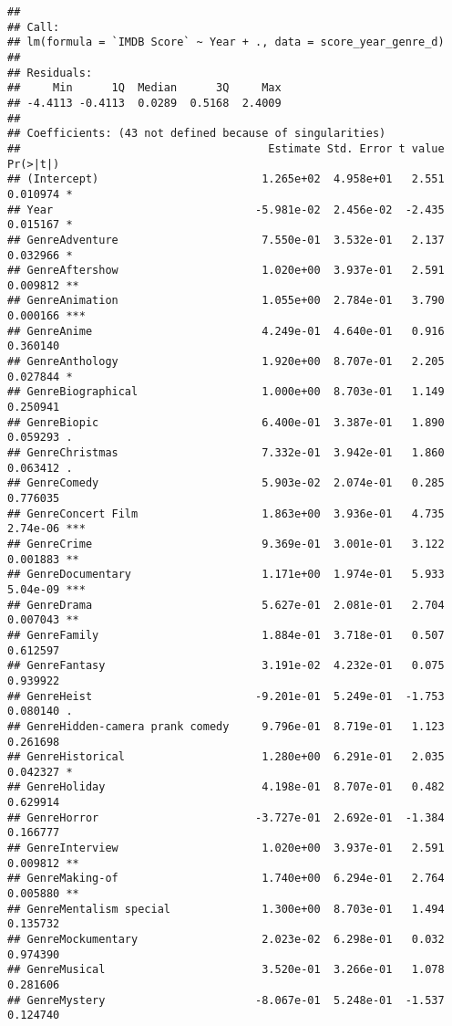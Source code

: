 \documentclass[
]{article}
\begin{document}
\begin{verbatim}
## 
## Call:
## lm(formula = `IMDB Score` ~ Year + ., data = score_year_genre_d)
## 
## Residuals:
##     Min      1Q  Median      3Q     Max 
## -4.4113 -0.4113  0.0289  0.5168  2.4009 
## 
## Coefficients: (43 not defined because of singularities)
##                                      Estimate Std. Error t value Pr(>|t|)    
## (Intercept)                         1.265e+02  4.958e+01   2.551 0.010974 *  
## Year                               -5.981e-02  2.456e-02  -2.435 0.015167 *  
## GenreAdventure                      7.550e-01  3.532e-01   2.137 0.032966 *  
## GenreAftershow                      1.020e+00  3.937e-01   2.591 0.009812 ** 
## GenreAnimation                      1.055e+00  2.784e-01   3.790 0.000166 ***
## GenreAnime                          4.249e-01  4.640e-01   0.916 0.360140    
## GenreAnthology                      1.920e+00  8.707e-01   2.205 0.027844 *  
## GenreBiographical                   1.000e+00  8.703e-01   1.149 0.250941    
## GenreBiopic                         6.400e-01  3.387e-01   1.890 0.059293 .  
## GenreChristmas                      7.332e-01  3.942e-01   1.860 0.063412 .  
## GenreComedy                         5.903e-02  2.074e-01   0.285 0.776035    
## GenreConcert Film                   1.863e+00  3.936e-01   4.735 2.74e-06 ***
## GenreCrime                          9.369e-01  3.001e-01   3.122 0.001883 ** 
## GenreDocumentary                    1.171e+00  1.974e-01   5.933 5.04e-09 ***
## GenreDrama                          5.627e-01  2.081e-01   2.704 0.007043 ** 
## GenreFamily                         1.884e-01  3.718e-01   0.507 0.612597    
## GenreFantasy                        3.191e-02  4.232e-01   0.075 0.939922    
## GenreHeist                         -9.201e-01  5.249e-01  -1.753 0.080140 .  
## GenreHidden-camera prank comedy     9.796e-01  8.719e-01   1.123 0.261698    
## GenreHistorical                     1.280e+00  6.291e-01   2.035 0.042327 *  
## GenreHoliday                        4.198e-01  8.707e-01   0.482 0.629914    
## GenreHorror                        -3.727e-01  2.692e-01  -1.384 0.166777    
## GenreInterview                      1.020e+00  3.937e-01   2.591 0.009812 ** 
## GenreMaking-of                      1.740e+00  6.294e-01   2.764 0.005880 ** 
## GenreMentalism special              1.300e+00  8.703e-01   1.494 0.135732    
## GenreMockumentary                   2.023e-02  6.298e-01   0.032 0.974390    
## GenreMusical                        3.520e-01  3.266e-01   1.078 0.281606    
## GenreMystery                       -8.067e-01  5.248e-01  -1.537 0.124740    

\end{verbatim}
\end{document}
